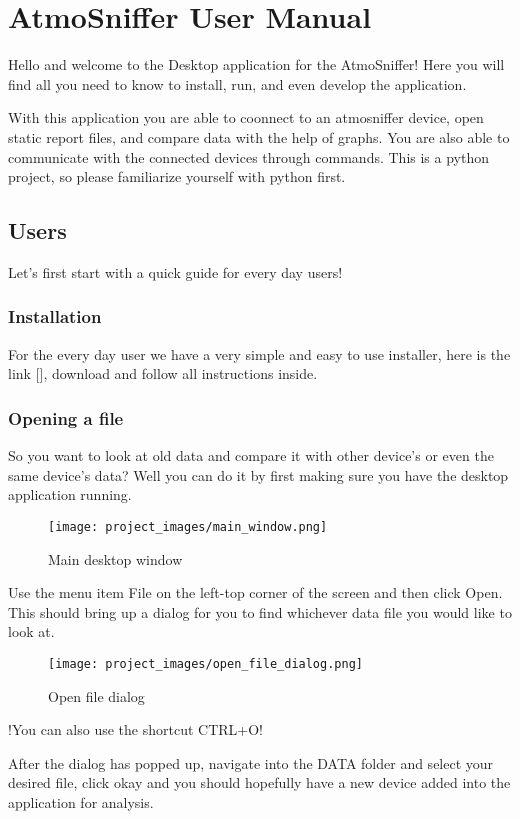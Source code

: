 \chapter{AtmoSniffer User Manual} %
	Hello and welcome to the Desktop application for the AtmoSniffer!
	Here you will find all you need to know to install, run, and even develop the application.

	With this application you are able to coonnect to an atmosniffer device, open static report files, and compare data with the help of graphs. You are also able to communicate with the connected devices through commands. This is a python project, so please familiarize yourself with python first.
\section{Users}
Let's first start with a quick guide for every day users!
\subsection{Installation}
	For the every day user we have a very simple and easy to use installer, here is the link [], download and follow all instructions inside.
\subsection{Opening a file}
	So you want to look at old data and compare it with other device's or even the same device's data? Well you can do it by first making sure you have the desktop application running.
\begin{figure}[H]
\centering
\texttt{[image: project\_images/main\_window.png]}
 \caption{Main desktop window}
 \label{fig:main window}
\end{figure}
\newpage

	Use the menu item File on the left-top corner of the screen and then click Open. This should bring up a dialog for you to find whichever data file you would like to look at.

\begin{figure}[H]
\centering
\texttt{[image: project\_images/open\_file\_dialog.png]}
 \caption{Open file dialog}
 \label{fig:open file dialog}
\end{figure}

	!You can also use the shortcut CTRL+O!

	After the dialog has popped up, navigate into the DATA folder and select your desired file, click okay and you should hopefully have a new device added into the application for analysis.

